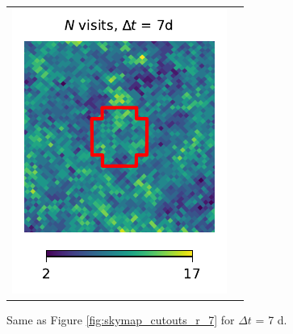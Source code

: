 \documentclass[preprintm,linenumbers]{aastex631}
\begin{document}
\begin{figure}
\begin{tabular}{@{}c@{}c@{}}
				\includegraphics{results/skymaps_cutout/skymaps_cutout_first_year_one_snap_v4_0_10yrs_db_noDD_noTwi_tscale-7_nside-256_doAllTemplateMetrics_reduceCount_r_WFD_noDD_noTwi.pdf} \\
			\end{tabular}
			\caption{
				 Same as Figure \ref{fig:skymap_cutouts_r_7} for $\Delta t$ = 7 d.  
			}
   \label{fig:_skymap_cutouts_r_7}
		\end{figure}
        
\end{document}
